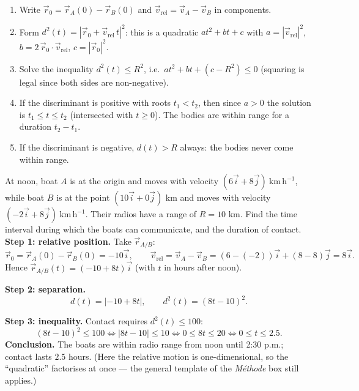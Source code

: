 \documentclass[11pt]{article}
\begin{document}
\begin{methode}
\begin{enumerate}
\item Write $\vec{r}_0=\vec{r}_A(0)-\vec{r}_B(0)$ and $\vec{v}_{\mathrm{rel}}=\vec{v}_A-\vec{v}_B$ in components.
\item Form $d^2(t)=|\vec{r}_0+\vec{v}_{\mathrm{rel}}\,t|^2$: this is a quadratic $at^2+bt+c$ with $a=|\vec{v}_{\mathrm{rel}}|^2$, $b=2\,\vec{r}_0\cdot\vec{v}_{\mathrm{rel}}$, $c=|\vec{r}_0|^2$.
\item Solve the inequality $d^2(t)\leq R^2$, i.e.\ $at^2+bt+(c-R^2)\leq 0$ (squaring is legal since both sides are non-negative).
\item If the discriminant is positive with roots $t_1<t_2$, then since $a>0$ the solution is $t_1\leq t\leq t_2$ (intersected with $t\geq 0$). The bodies are within range for a duration $t_2-t_1$.
\item If the discriminant is negative, $d(t)>R$ always: the bodies never come within range.
\end{enumerate}
\end{methode}

\begin{exoresolu}
At noon, boat $A$ is at the origin and moves with velocity $(6\vec{i}+8\vec{j})\ \mathrm{km\,h^{-1}}$, while boat $B$ is at the point $(10\vec{i}+0\vec{j})$ km and moves with velocity $(-2\vec{i}+8\vec{j})\ \mathrm{km\,h^{-1}}$. Their radios have a range of $R=10$ km. Find the time interval during which the boats can communicate, and the duration of contact.
\tcblower
\textbf{Step 1: relative position.} Take $\vec{r}_{A/B}$:
\[
\vec{r}_0=\vec{r}_A(0)-\vec{r}_B(0)=-10\vec{i},\qquad
\vec{v}_{\mathrm{rel}}=\vec{v}_A-\vec{v}_B=(6-(-2))\vec{i}+(8-8)\vec{j}=8\vec{i}.
\]
Hence $\vec{r}_{A/B}(t)=(-10+8t)\vec{i}$ (with $t$ in hours after noon).

\textbf{Step 2: separation.}
\[
d(t)=|{-10}+8t|,\qquad d^2(t)=(8t-10)^2.
\]

\textbf{Step 3: inequality.} Contact requires $d^2(t)\leq 100$:
\[
(8t-10)^2\leq 100\iff |8t-10|\leq 10\iff 0\leq 8t\leq 20\iff 0\leq t\leq 2.5.
\]
\textbf{Conclusion.} The boats are within radio range from noon until 2:30 p.m.; contact lasts $\mathbf{2.5}$ hours. (Here the relative motion is one-dimensional, so the ``quadratic'' factorises at once --- the general template of the \emph{M\'ethode} box still applies.)
\end{exoresolu}
\end{document}
